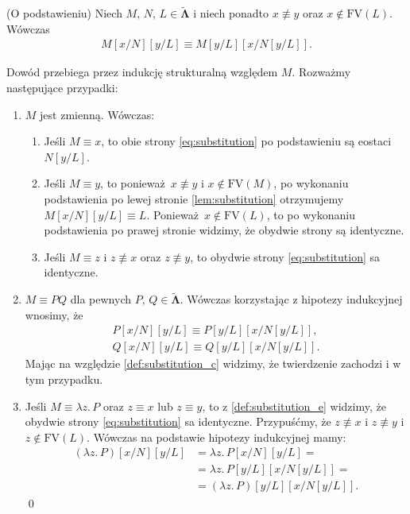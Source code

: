 \begin{lemat}(O podstawieniu)\label{lem:substitution}
  Niech \(M,\,N,\,L\in \mathbf{\tilde\Lambda}\) i niech ponadto \(x\not\equiv y\) oraz \(x\not\in\mathrm{FV}(L)\). Wówczas
  \begin{align}\label{eq:substitution}
    M[x/N][y/L]\equiv M[y/L]\left[x/N\left[y/L\right]\right].
  \end{align}
  \begin{dowod}
    Dowód przebiega przez indukcję strukturalną względem \(M\). Rozważmy następujące przypadki:
    \begin{enumerate}[label={\roman*)}, ref={(\arabic*)}]
      \item \(M\) jest zmienną. Wówczas:
        \begin{enumerate}[label={\alph*.}]
        \item Jeśli \(M\equiv x\), to obie strony \eqref{eq:substitution} po podstawieniu są eostaci \(N[y/L]\).
        \item Jeśli \(M\equiv y\), to ponieważ \(x\not\equiv y\) i \(x\not\in\mathrm{FV}(M)\), po wykonaniu podstawienia po lewej stronie \eqref{lem:substitution} otrzymujemy \(M[x/N][y/L]\equiv L\). Ponieważ \(x\not\in\mathrm{FV}(L)\), to po wykonaniu podstawienia po prawej stronie widzimy, że obydwie strony są identyczne.

        \item Jeśli \(M\equiv z\) i \(z\not\equiv x\)  oraz \(z\not\equiv y\), to obydwie strony \eqref{eq:substitution} sa identyczne.
        \end{enumerate}

      \item \(M\equiv P Q\) dla pewnych \(P,\,Q\in\mathbf{\tilde\Lambda}\). Wówczas korzystając z hipotezy indukcyjnej wnosimy, że
        \begin{align*}
          P[x/N][y/L]\equiv P[y/L]\left[x/N\left[y/L\right]\right],\\
          Q[x/N][y/L]\equiv Q[y/L]\left[x/N\left[y/L\right]\right].
        \end{align*}
        Mając na względzie \ref{def:substitution_c} widzimy, że twierdzenie zachodzi i w tym przypadku.
        \item Jeśli \(M\equiv \lambda z.\,P\) oraz \(z\equiv x\) lub \(z\equiv y\), to z \ref{def:substitution_e} widzimy, że obydwie strony \eqref{eq:substitution} sa identyczne. Przypuśćmy, że \(z\not\equiv x\) i \(z\not\equiv y\) i \(z\not\in\mathrm{FV}(L)\). Wówczas na podstawie hipotezy indukcyjnej mamy:
      \begin{align*}
        (\lambda z.\,P)[x/N][y/L] &= \lambda z.\,P[x/N][y/L] =\\
                                  &= \lambda z.\,P[y/L][x/N[y/L]] =\\
                                  &= (\lambda z.\,P)[y/L][x/N[y/L]].
      \end{align*}
    \qed
    \end{enumerate}
  \end{dowod}
\end{lemat}

